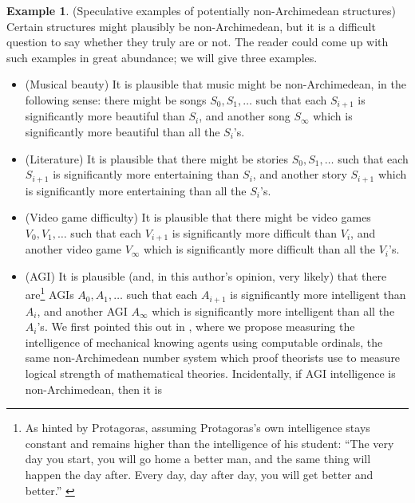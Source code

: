 \documentclass[reqno]{article}
\theoremstyle{definition}
\newtheorem{example}[theorem]{Example}
\begin{document}
\begin{example}
\label{speculativeexamples}
    (Speculative examples of potentially non-Archimedean structures)
    Certain structures might plausibly be non-Archimedean, but it is a difficult
    question to say whether they truly are or not. The reader could come up with
    such examples in great abundance; we will give three examples.
    \begin{itemize}
        \item
        (Musical beauty)
        It is plausible that music might be non-Archimedean, in the following
        sense: there might be songs $S_0,S_1,\ldots$ such that each $S_{i+1}$
        is significantly more beautiful than $S_i$, and another song
        $S_\infty$ which is significantly more beautiful than all the $S_i$'s.
        \item
        (Literature)
        It is plausible that there might be stories $S_0,S_1,\ldots$ such that
        each $S_{i+1}$ is significantly more entertaining than $S_i$, and
        another story $S_{i+1}$ which is significantly more entertaining than
        all the $S_i$'s.
        \item
        (Video game difficulty)
        It is plausible that there might be video games $V_0,V_1,\ldots$ such that
        each $V_{i+1}$ is significantly more difficult than $V_i$, and another
        video game $V_\infty$ which is significantly more difficult than
        all the $V_i$'s.
        \item
        (AGI)
        It is plausible (and, in this author's opinion, very likely) that there
        are\footnote{As hinted by Protagoras, assuming Protagoras's own intelligence
        stays constant and remains higher than the intelligence of his student:
        ``The very day you start, you will go home a better man, and the same thing
        will happen the day after. Every day, day after day, you will get better
        and better.'' \cite{protagoras}} AGIs $A_0,A_1,\ldots$ such that
        each $A_{i+1}$ is significantly more
        intelligent than $A_i$, and another AGI $A_\infty$ which is significantly more
        intelligent than all the $A_i$'s. We first pointed this out in
        \cite{alexander2019measuring}, where we propose measuring the
        intelligence of mechanical
        knowing agents using computable ordinals, the same non-Archimedean number system
        which proof theorists use to measure logical strength of mathematical
        theories. Incidentally, if AGI intelligence is non-Archimedean, then it is

\end{itemize}
\end{example}
\end{document}

